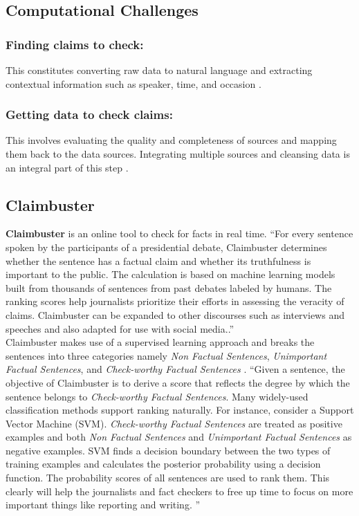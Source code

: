 \documentclass[sigconf]{acmart}
\begin{document}
\subsection{Computational Challenges} 
\subsubsection{\textbf{Finding claims to check:}} This constitutes converting raw data to natural language and extracting contextual information such as speaker, time, and occasion \cite{Hassan2015}.
\subsubsection{\textbf{Getting data to check claims:}} This involves evaluating the quality and completeness of sources and mapping them back to the data sources. Integrating multiple sources and cleansing data is an integral part of this step \cite{Hassan2015}.

\subsection{Claimbuster}
\textbf{Claimbuster} is an online tool to check for facts in real time. ``For every sentence spoken by the participants of a presidential debate, Claimbuster determines whether the sentence has a factual claim and whether its truthfulness is important to the public. The calculation is based on machine learning models built from thousands of sentences from past debates labeled by humans. The ranking scores help journalists prioritize their efforts in assessing the veracity of claims. Claimbuster can be expanded to other discourses such as interviews and speeches and also adapted for use with social media.\cite{Hassan2015}.'' \\
Claimbuster makes use of a supervised learning approach and breaks the sentences into three categories namely \textit{Non Factual Sentences}, \textit{Unimportant Factual Sentences}, and \textit{Check-worthy Factual Sentences} \cite{Hassan2015}. ``Given a sentence, the objective of Claimbuster is to derive a score that reflects the degree by which the sentence belongs to \textit{Check-worthy Factual Sentences}. Many widely-used classification methods support ranking naturally. For instance, consider a Support Vector Machine (SVM). \textit{Check-worthy Factual Sentences} are treated as positive examples and both \textit{Non Factual Sentences} and \textit{Unimportant Factual Sentences} as negative examples. SVM finds a decision boundary between the two types of training examples and calculates the posterior probability using a decision function. The probability scores of all sentences are used to rank them. This clearly will help the journalists and fact checkers to free up time to focus on more important things like reporting and writing. \cite{Hassan2015}''
\end{document}
